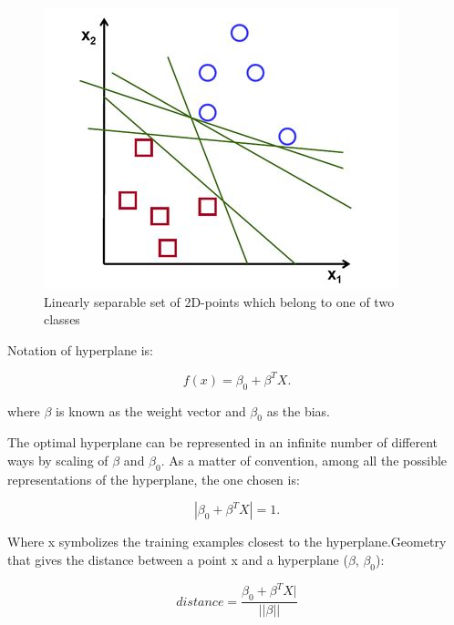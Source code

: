 \documentclass{article}\usepackage[]{graphicx}\usepackage[]{color}
\begin{document}
\begin{figure}[h]
\begin{center}
\includegraphics [scale=0.75]{svm.JPG}
\end{center}
\caption{Linearly separable set of 2D-points which belong to one of two classes}
\end{figure}

Notation of hyperplane is:

\hspace{5cm}\begin{equation} \label{eq:hyper_plane}
f(x)= \beta_0 + \beta^T X.
\end{equation}

where $\beta$ is known as the weight vector and $\beta_{0}$ as the bias.

The optimal hyperplane can be represented in an infinite number of different
ways by scaling of $\beta$ and $\beta_{0}$. As a matter of convention, among all the
possible representations of the hyperplane, the one chosen is:


\hspace{5cm}\begin{equation} \label{eq:hyperplane}
|\beta_0 + \beta^T X|=1.
\end{equation}

\par Where x symbolizes the training examples closest to the hyperplane.Geometry that gives the distance between a point x and a hyperplane ($\beta$, $\beta_{0}$):

\hspace{5cm}
\begin{equation} \label{eq:dist}
distance = \frac{\beta_0 + \beta^T X|}{||\beta||}
\end{equation}
\end{document}
